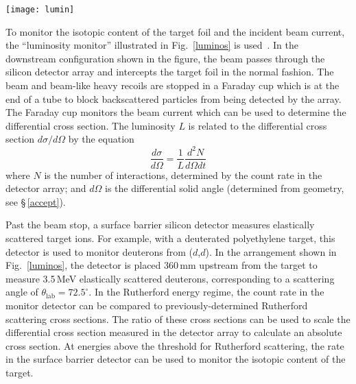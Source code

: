\begin{figure*}%
\centering
\texttt{[image: lumin]}%
\caption[Illustration of the luminosity monitor design]{Illustration of the luminosity monitor design.  Calculated trajectories for 5\,\AMeV $^{136}$Xe on a deuterium target with $\mathscr{B}_0=2.0$\,T.  In the rearward hemisphere, protons from the ground-state transition of the ($d$,$p$) reaction intercept the array.  The plotted trajectories were calculated such that each trajectory intercepts the center of a detector element for a target-array setting of $\Delta z = 64$\,mm.  In the upstream hemisphere elastically scattered deuterons intercept the luminosity monitor located at $z=+360$\,mm, relative to the target.  The unreacted beam and beam-like reaction products are stopped in a Faraday cup which includes a backscattering baffle.  Adapted from Ref.~\cite{Kay_2010HID}.}%
\label{luminos}%
\end{figure*}

To monitor the isotopic content of the target foil and the incident beam current, the ``luminosity monitor'' illustrated in Fig.~\ref{luminos} is used~\cite{Kay_2010APS}.  In the downstream configuration shown in the figure, the beam passes through the silicon detector array and intercepts the target foil in the normal fashion.  The beam and beam-like heavy recoils are stopped in a Faraday cup which is at the end of a tube to block backscattered particles from being detected by the array.  The Faraday cup monitors the beam current which can be used to determine the differential cross section.  The luminosity $L$ is related to the differential cross section $d\sigma/d\Omega$ by the equation
\begin{equation}
\frac{d\sigma}{d\Omega}=\frac{1}{L}\frac{d^2 N}{d\Omega dt}
\label{luminosity}
\end{equation}
where $N$ is the number of interactions, determined by the count rate in the detector array; and $d\Omega$ is the differential solid angle (determined from geometry, see \S\,\ref{accept}).  

Past the beam stop, a surface barrier silicon detector measures elastically scattered target ions.  For example, with a deuterated polyethylene target, this detector is used to monitor deuterons from ($d$,$d$).  In the arrangement shown in Fig.~\ref{luminos}, the detector is placed 360\,mm upstream from the target to measure 3.5\,MeV elastically scattered deuterons, corresponding to a scattering angle of $\theta_\mathrm{lab}=72.5^\circ$.  In the Rutherford energy regime, the count rate in the monitor detector can be compared to previously-determined Rutherford scattering cross sections.  The ratio of these cross sections can be used to scale the differential cross section measured in the detector array to calculate an absolute cross section.  At energies above the threshold for Rutherford scattering, the rate in the surface barrier detector can be used to monitor the isotopic content of the target.

